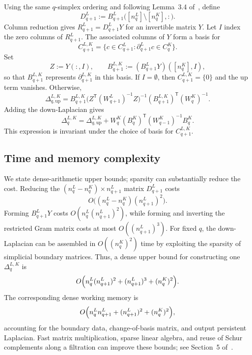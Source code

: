 \documentclass{article}
\begin{document}
Using the same $q$-simplex ordering and following Lemma~3.4
of~\cite{memoli2022persistent}, define
\[
D^L_{q+1}
  :=B^L_{q+1}\bigl([n_q^L]\setminus[n_q^K],:\bigr).
\]
Column reduction gives $R^L_{q+1}=D^L_{q+1}Y$ for an invertible matrix $Y$.
Let $I$ index the zero columns of $R^L_{q+1}$. The associated columns of $Y$
form a basis for
\[
C^{L,K}_{q+1}
  =\{c\in C^L_{q+1}:\partial^L_{q+1}c\in C^K_q\}.
\]
Set
\[
Z:=Y(:,I),
\qquad
B^{L,K}_{q+1}:=
  (B^L_{q+1}Y)([n_q^K],I),
\]
so that $B^{L,K}_{q+1}$ represents $\partial^{L,K}_{q+1}$ in this basis.
If $I=\emptyset$, then $C^{L,K}_{q+1}=\{0\}$ and the up term vanishes.
Otherwise,
\[
\Delta^{L,K}_{q,\mathrm{up}}
=B^{L,K}_{q+1}
 \bigl(Z^{\mathsf T}(W^L_{q+1})^{-1}Z\bigr)^{-1}
 (B^{L,K}_{q+1})^{\mathsf T}(W^K_q)^{-1}.
\]
Adding the down-Laplacian gives
\[
\Delta^{L,K}_q
=\Delta^{L,K}_{q,\mathrm{up}}
 +W^K_q(B^K_q)^{\mathsf T}(W^K_{q-1})^{-1}B^K_q.
\]
This expression is invariant under the choice of basis for
$C^{L,K}_{q+1}$.

\subsection{Time and memory complexity}

We state dense-arithmetic upper bounds; sparsity can substantially reduce the
cost. Reducing the $(n_q^L-n_q^K)\times n_{q+1}^L$ matrix $D^L_{q+1}$ costs
\[
O\bigl((n_q^L-n_q^K)(n_{q+1}^L)^2\bigr).
\]
Forming $B^L_{q+1}Y$ costs $O(n_q^L(n_{q+1}^L)^2)$, while forming and
inverting the restricted Gram matrix costs at most $O((n_{q+1}^L)^3)$.
For fixed $q$, the down-Laplacian can be assembled in
$O((n_q^K)^2)$ time by exploiting the sparsity of simplicial boundary
matrices. Thus, a dense upper bound for constructing one
$\Delta_q^{L,K}$ is
\begin{equation}
\label{eq:time-complexity}
O\Bigl(
n_q^L(n_{q+1}^L)^2
+(n_{q+1}^L)^3
+(n_q^K)^2
\Bigr).
\end{equation}
The corresponding dense working memory is
\begin{equation}
\label{eq:memory-complexity}
O\Bigl(
n_q^L n_{q+1}^L
+(n_{q+1}^L)^2
+(n_q^K)^2
\Bigr),
\end{equation}
accounting for the boundary data, change-of-basis matrix, and output
persistent Laplacian. Fast matrix multiplication, sparse linear algebra, and
reuse of Schur complements along a filtration can improve these bounds; see
Section~5 of~\cite{memoli2022persistent}.
\end{document}
